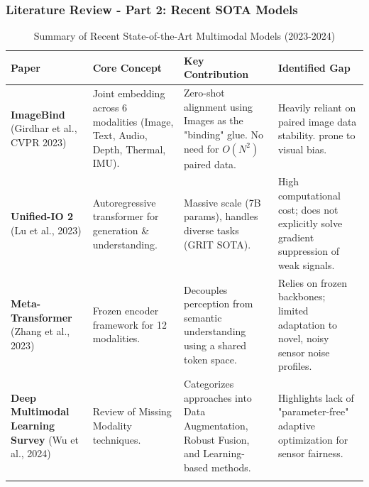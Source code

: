 \documentclass[serif, aspectratio=169]{beamer}
\begin{document}
\begin{frame}{}
    \frametitle<presentation>{Literature Review - Part 2: Recent SOTA Models}
\tiny{
\begin{table}
    \caption{Summary of Recent State-of-the-Art Multimodal Models (2023-2024)}	
    \label{tab:litreview-sota} 

    \begin{tabularx}{\textwidth}{p{2.0cm}p{2.5cm}p{3.5cm}p{3.5cm}} 
        \toprule
        \textbf{Paper} & \textbf{Core Concept} & \textbf{Key Contribution} & \textbf{Identified Gap} \\ 		
        \midrule

        \textbf{ImageBind} (Girdhar et al., CVPR 2023) &
        Joint embedding across 6 modalities (Image, Text, Audio, Depth, Thermal, IMU). &
        Zero-shot alignment using Images as the "binding" glue. No need for $O(N^2)$ paired data. &
        Heavily reliant on paired image data stability. prone to visual bias. \\ \hline

        \textbf{Unified-IO 2} (Lu et al., 2023) &
        Autoregressive transformer for generation \& understanding. &
        Massive scale (7B params), handles diverse tasks (GRIT SOTA). &
        High computational cost; does not explicitly solve gradient suppression of weak signals. \\ \hline

        \textbf{Meta-Transformer} (Zhang et al., 2023) &
        Frozen encoder framework for 12 modalities. &
        Decouples perception from semantic understanding using a shared token space. &
        Relies on frozen backbones; limited adaptation to novel, noisy sensor noise profiles. \\ \hline

        \textbf{Deep Multimodal Learning Survey} (Wu et al., 2024) &
        Review of Missing Modality techniques. &
        Categorizes approaches into Data Augmentation, Robust Fusion, and Learning-based methods. &
        Highlights lack of "parameter-free" adaptive optimization for sensor fairness. \\

        \noalign{\smallskip}\hline
    \end{tabularx}
\end{table}}
\end{frame}
\end{document}

